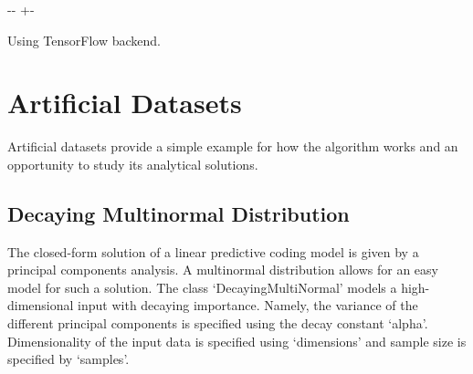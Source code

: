 \documentclass[letterpaper,10pt,english]{sphinxmanual}
\newlength\nbsphinxcodecellspacing
\begin{document}
%
{
\kern-\sphinxverbatimsmallskipamount\kern-\baselineskip
\kern+\FrameHeightAdjust\kern-\fboxrule
\vspace{\nbsphinxcodecellspacing}
%
\begin{sphinxVerbatim}[commandchars=\\\{\}]
Using TensorFlow backend.
\end{sphinxVerbatim}
}
\relax


\section{Artificial Datasets}
\label{\detokenize{usage/datasets:Artificial-Datasets}}
Artificial datasets provide a simple example for how the algorithm works and an opportunity to study its analytical solutions.


\subsection{Decaying Multinormal Distribution}
\label{\detokenize{usage/datasets:Decaying-Multinormal-Distribution}}
The closed-form solution of a linear predictive coding model is given by a principal components analysis. A multinormal distribution allows for an easy model for such a solution. The class ‘DecayingMultiNormal’ models a high-dimensional input with decaying importance. Namely, the variance of the different principal components is specified using the decay constant ‘alpha’. Dimensionality of the input data is specified using ‘dimensions’ and sample size is specified by ‘samples’.

{
\begin{sphinxVerbatim}[commandchars=\\\{\}]
\llap{\color{nbsphinxin}[1]:\,\hspace{\fboxrule}\hspace{\fboxsep}}    
                                    
                                    
 
   
\end{sphinxVerbatim}
}
\end{document}
